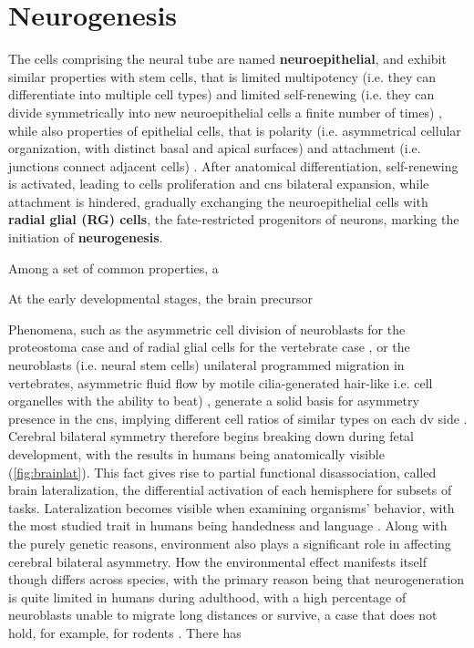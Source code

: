 \section{Neurogenesis}
The cells comprising the neural tube are named \textbf{neuroepithelial}, and exhibit similar properties with stem cells, that is limited multipotency (i.e. they can differentiate into multiple cell types) and limited self-renewing (i.e. they can divide symmetrically into new neuroepithelial cells a finite number of times) \cite{Gotz2005}, while also properties of epithelial cells, that is polarity (i.e. asymmetrical cellular organization, with distinct basal and apical surfaces) and attachment (i.e. junctions connect adjacent cells) . After anatomical differentiation, self-renewing is activated, leading to cells proliferation and \ac{cns} bilateral expansion, while attachment is hindered, gradually exchanging the neuroepithelial cells with \textbf{radial glial (RG) cells}, the fate-restricted progenitors of neurons, marking the initiation of \textbf{neurogenesis}.\cite{Gotz2005}

Among a set of common properties, a

At the early developmental stages, the brain precursor





 



Phenomena, such as the asymmetric cell division of neuroblasts for the proteostoma case and of radial glial cells for the vertebrate case \cite{Bailly2013} , or the neuroblasts (i.e. neural stem cells) unilateral programmed migration  in vertebrates, asymmetric fluid flow   by motile cilia-generated hair-like i.e. cell organelles with the ability to beat) \cite{Grimes2017}, generate a solid basis for asymmetry presence in the \ac{cns}, implying different cell ratios of similar types on each \ac{dv} side \cite{Concha2012}. Cerebral bilateral symmetry therefore begins breaking down during fetal development, with the results in humans being anatomically visible (\autoref{fig:brainlat}). This fact gives rise to partial functional disassociation, called brain lateralization, the differential activation of each hemisphere for subsets of tasks. Lateralization becomes visible when examining organisms' behavior, with the most studied trait in humans being handedness and language \cite{Schmitz2019}\cite{Corballis2009}. 
Along with the purely genetic reasons, environment also plays a significant role in affecting cerebral bilateral asymmetry. How the environmental effect manifests itself though differs across species, with the primary reason being that neurogeneration is quite limited in humans during adulthood, with a high percentage of neuroblasts unable to migrate long distances or survive, a case that does not hold, for example, for rodents \cite{Ernst2015}. There has  


